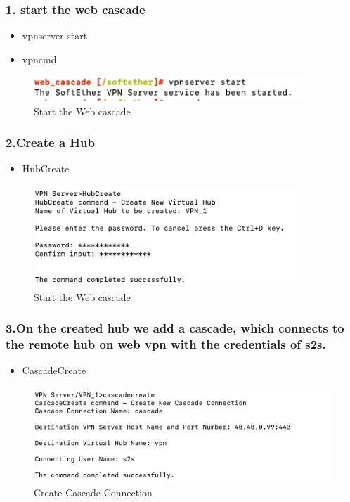 \subsubsection{1. start the web cascade}
\begin{itemize}
    \item vpnserver start
\end{itemize}
\begin{itemize}
    \item vpncmd
\end{itemize}
\begin{figure}[H]
\centering
  \includegraphics[width=0.9\textwidth]{Images/web_cascade start.png}
  \caption{Start the Web cascade }
  \label{fig }
\end{figure}
\subsubsection{2.Create a Hub}
\begin{itemize}
    \item HubCreate
\end{itemize}
\begin{figure}[H]
\centering
  \includegraphics[width=0.9\textwidth]{Images/Hubcreate.png}
  \caption{Start the Web cascade }
  \label{fig }
\end{figure}
\subsubsection{3.On the created hub we add a cascade, which connects to the remote hub
on web vpn with the credentials of s2s.}
\begin{itemize}
    \item CascadeCreate
\end{itemize}
\begin{figure}[H]
\centering
  \includegraphics[width=1\textwidth]{Images/cascade_create.png}
  \caption{Create Cascade Connection }
  \label{fig }
\end{figure}
